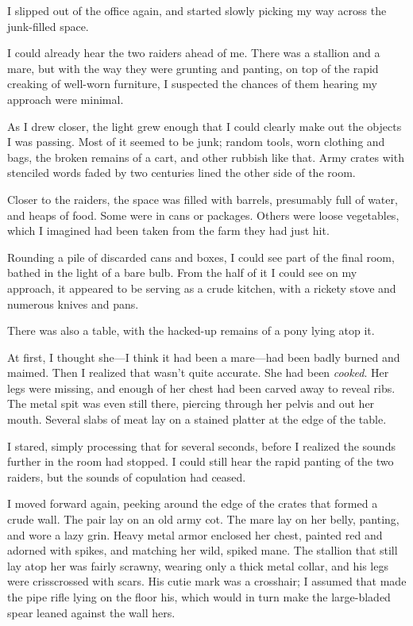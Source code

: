 I slipped out of the office again, and started slowly picking my way across the junk-filled space.

I could already hear the two raiders ahead of me. There was a stallion and a mare, but with the way they were grunting and panting, on top of the rapid creaking of well-worn furniture, I suspected the chances of them hearing my approach were minimal.

As I drew closer, the light grew enough that I could clearly make out the objects I was passing. Most of it seemed to be junk; random tools, worn clothing and bags, the broken remains of a cart, and other rubbish like that. Army crates with stenciled words faded by two centuries lined the other side of the room.

Closer to the raiders, the space was filled with barrels, presumably full of water, and heaps of food. Some were in cans or packages. Others were loose vegetables, which I imagined had been taken from the farm they had just hit.

Rounding a pile of discarded cans and boxes, I could see part of the final room, bathed in the light of a bare bulb. From the half of it I could see on my approach, it appeared to be serving as a crude kitchen, with a rickety stove and numerous knives and pans.

There was also a table, with the hacked-up remains of a pony lying atop it.

At first, I thought she—I think it had been a mare—had been badly burned and maimed. Then I realized that wasn’t quite accurate. She had been \textit{cooked}. Her legs were missing, and enough of her chest had been carved away to reveal ribs. The metal spit was even still there, piercing through her pelvis and out her mouth. Several slabs of meat lay on a stained platter at the edge of the table.

I stared, simply processing that for several seconds, before I realized the sounds further in the room had stopped. I could still hear the rapid panting of the two raiders, but the sounds of copulation had ceased.

I moved forward again, peeking around the edge of the crates that formed a crude wall. The pair lay on an old army cot. The mare lay on her belly, panting, and wore a lazy grin. Heavy metal armor enclosed her chest, painted red and adorned with spikes, and matching her wild, spiked mane. The stallion that still lay atop her was fairly scrawny, wearing only a thick metal collar, and his legs were crisscrossed with scars. His cutie mark was a crosshair; I assumed that made the pipe rifle lying on the floor his, which would in turn make the large-bladed spear leaned against the wall hers.

